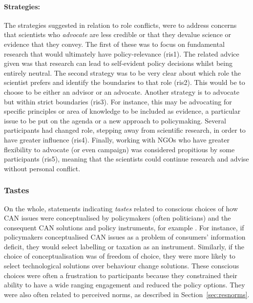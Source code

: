 \paragraph{Strategies:}
The strategies suggested in relation to role conflicts, were to address concerns that scientists who \emph{advocate} are less credible or that they devalue science or evidence that they convey. The first of these was to focus on fundamental research that would ultimately have policy-relevance (ris1). The related advice given was that research can lead to self-evident policy decisions whilst being entirely neutral. The second strategy was to be very clear about which role the scientist prefers and identify the boundaries to that role (ris2). This would be to choose to be either an advisor or an advocate. Another strategy is to advocate but within strict boundaries (ris3). For instance, this may be advocating for specific principles or area of knowledge to be included as evidence, a particular issue to be put on the agenda or a new approach to policymaking. Several participants had changed role, stepping away from scientific research, in order to have greater influence (ris4). Finally, working with NGOs who have greater flexibility to advocate (or even campaign) was considered propitious by some participants (ris5), meaning that the scientists could continue research and advise without personal conflict.

\subsubsection{Tastes}\label{sec:restastes}
On the whole, statements indicating \emph{tastes} related to conscious choices of how CAN issues were conceptualised by policymakers (often politicians) and the consequent CAN solutions and policy instruments, for example . For instance, if policymakers conceptualised CAN issues as a problem of consumers' information deficit, they would select labelling or taxation as an instrument. Similarly, if the choice of conceptualisation was of freedom of choice, they were more likely to select technological solutions over behaviour change solutions. These conscious choices were often a frustration to participants because they constrained their ability to have a wide ranging engagement and reduced the policy options. They were also often related to perceived norms, as described in Section~\ref{sec:resnorms}.


